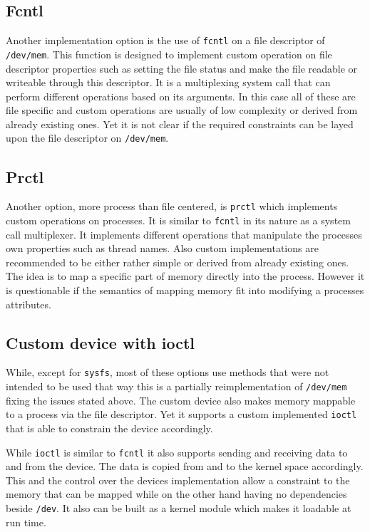 \documentclass[
a4paper,
12pt,
notitlepage,
parskip=half,
DIV=11,
]{scrbook}
\begin{document}
		\subsection{Fcntl}
		
		Another implementation option is the use of \texttt{fcntl} on a file descriptor of \texttt{/dev/mem}.
		This function is designed to implement custom operation on file descriptor properties such as setting the file status and make the file readable or writeable through this descriptor.
		It is a multiplexing system call that can perform different operations based on its arguments.
		In this case all of these are file specific and custom operations are usually of low complexity or derived from already existing ones.
		Yet it is not clear if the required constraints can be layed upon the file descriptor on \texttt{/dev/mem}. \citep{syscall} \citep{fcntl}
		
		\subsection{Prctl}
		
		Another option, more process than file centered, is \texttt{prctl} which implements custom operations on processes.
		It is similar to \texttt{fcntl} in its nature as a system call multiplexer.
		It implements different operations that manipulate the processes own properties such as thread names.
		Also custom implementations are recommended to be either rather simple or derived from already existing ones.
		The idea is to map a specific part of memory directly into the process.
		However it is questionable if the semantics of mapping memory fit into modifying a processes attributes. \citep{syscall} \citep{prctl}
		
		\subsection{Custom device with ioctl}
		
		While, except for \texttt{sysfs}, most of these options use methods that were not intended to be used that way this is a partially reimplementation of \texttt{/dev/mem} fixing the issues stated above.
		The custom device also makes memory mappable to a process via the file descriptor.
		Yet it supports a custom implemented \texttt{ioctl} that is able to constrain the device accordingly.
		
		While \texttt{ioctl} is similar to \texttt{fcntl} it also supports sending and receiving data to and from the device.
		The data is copied from and to the kernel space accordingly.
		This and the control over the devices implementation allow a constraint to the memory that can be mapped while on the other hand having no dependencies beside \texttt{/dev}.
		It also can be built as a kernel module which makes it loadable at run time. \citep{ioctl}
		
\end{document}
